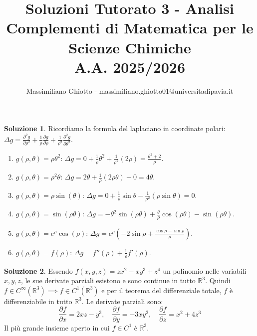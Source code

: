 \documentclass[12pt,a4paper]{article}
\title{Soluzioni Tutorato 3 - Analisi\\Complementi di Matematica per le Scienze Chimiche\\ A.A. 2025/2026}
\author{Massimiliano Ghiotto - massimiliano.ghiotto01@universitadipavia.it}
\date{}
\theoremstyle{definition}
\newtheorem{sol}{Soluzione}
\begin{document}
\maketitle

\begin{sol}
    Ricordiamo la formula del laplaciano in coordinate polari: $\Delta g = \frac{\partial^2 g}{\partial \rho^2} + \frac{1}{\rho}\frac{\partial g}{\partial \rho} + \frac{1}{\rho^2}\frac{\partial^2 g}{\partial \theta^2}$.
    \begin{enumerate}
        \item $g(\rho, \theta) = \rho \theta^2$: $\Delta g = 0 + \frac{1}{\rho}\theta^2 + \frac{1}{\rho^2}(2\rho) = \frac{\theta^2 + 2}{\rho}$.
        \item $g(\rho, \theta) = \rho^2 \theta$: $\Delta g = 2\theta + \frac{1}{\rho}(2\rho\theta) + 0 = 4\theta$.
        \item $g(\rho, \theta) = \rho \sin(\theta)$: $\Delta g = 0 + \frac{1}{\rho}\sin\theta - \frac{1}{\rho^2}(\rho\sin\theta) = 0$.
        \item $g(\rho, \theta) = \sin(\rho \theta)$: $\Delta g = -\theta^2 \sin(\rho\theta) + \frac{\theta}{\rho}\cos(\rho\theta) - \sin(\rho\theta)$.
        \item $g(\rho, \theta) = e^\rho \cos(\rho)$: $\Delta g = e^\rho \left( -2\sin\rho + \frac{\cos\rho - \sin\rho}{\rho} \right)$.
        \item $g(\rho, \theta) = f(\rho)$: $\Delta g = f''(\rho) + \frac{1}{\rho}f'(\rho)$.
    \end{enumerate}
\end{sol}

\begin{sol}
    Essendo $f(x,y,z) = zx^2 - xy^3 + z^4$ un polinomio nelle variabili $x, y, z$, le sue derivate parziali esistono e sono continue in tutto $\mathbb{R}^3$. Quindi $f \in C^\infty(\mathbb{R}^3) \implies f \in C^1(\mathbb{R}^3)$ e per il teorema del differenziale totale, $f$ è differenziabile in tutto $\mathbb{R}^3$. Le derivate parziali sono:
    \[
        \frac{\partial f}{\partial x} = 2xz - y^3, \quad \frac{\partial f}{\partial y} = -3xy^2, \quad \frac{\partial f}{\partial z} = x^2 + 4z^3
    \]
    Il più grande insieme aperto in cui $f \in C^1$ è $\mathbb{R}^3$.
\end{sol}
\end{document}
